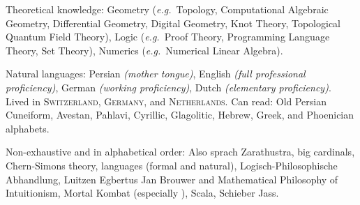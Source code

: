 \documentclass[10pt,a4paper]{article}
\begin{document}
\vspace{0.5em}
\inlineheadsection
  {Theoretical knowledge:}
  {Geometry (\textit{e.g.}~Topology, Computational Algebraic Geometry, Differential Geometry, Digital Geometry, Knot Theory, Topological Quantum Field Theory), Logic (\textit{e.g.}~Proof Theory, Programming Language Theory, Set Theory), Numerics (\textit{e.g.}~Numerical Linear Algebra).}
  
\vspace{0.5em}
\inlineheadsection
  {Natural languages:}
  {Persian \emph{(mother tongue)}, English \emph{(full professional proficiency)}, German \emph{(working proficiency)}, Dutch \emph{(elementary proficiency)}. Lived in \textsc{Switzerland}, \textsc{Germany}, and \textsc{Netherlands}. Can read: Old Persian Cuneiform, Avestan, Pahlavi, Cyrillic, Glagolitic, Hebrew, Greek, and Phoenician alphabets.}


\spacedhrule{1.6em}{-0.4em}


\inlineheadsection
  {Non-exhaustive and in alphabetical order:}
  {Also sprach Zarathustra, big cardinals, Chern-Simons theory, languages (formal and natural), Logisch-Philosophische Abhandlung, Luitzen Egbertus Jan Brouwer and Mathematical Philosophy of Intuitionism, Mortal Kombat (especially ), Scala, Schieber Jass.}
\end{document}
